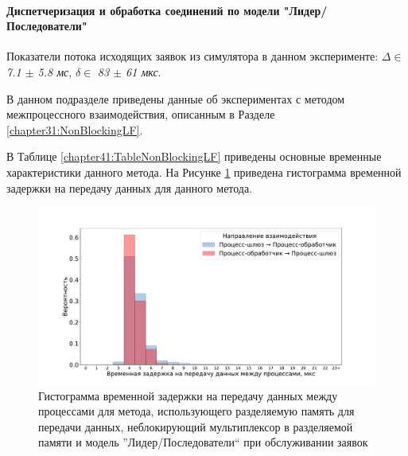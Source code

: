 \paragraph{Диспетчеризация и обработка соединений по модели "Лидер/Последователи"}

Показатели потока исходящих заявок из симулятора в данном эксперименте: $\Delta \in$ \textit{7.1 $\pm$ 5.8 мс}, $\delta \in$ \textit{83 $\pm$ 61 мкс}.

В данном подразделе приведены данные об экспериментах с методом межпроцессного взаимодействия, описанным в Разделе \ref{chapter31:NonBlockingLF}.

В Таблице \ref{chapter41:TableNonBlockingLF} приведены основные временные характеристики данного метода. На Рисунке \ref{chapter41:FigNonBlockingLF} приведена гистограмма временной задержки на передачу данных для данного метода.

\begin{figure}[!h]
\caption{Гистограмма временной задержки на передачу данных между процессами для метода, использующего разделяемую память для передачи данных, неблокирующий мультиплексор в разделяемой памяти и модель ''Лидер/Последователи`` при обслуживании заявок}
\label{chapter41:FigNonBlockingLF}
\includegraphics[width=\textwidth]{../../graphics/hist/NonBlockingLF}
\end{figure}

